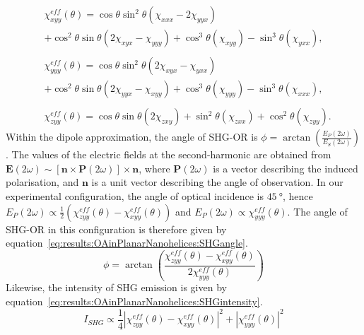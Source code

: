 \begin{equation}\label{eq:results:OAinPlanarNanohelices:ChiEff}
	\begin{split}
		&\chi_{xyy}^{eff}(\theta) = \cos\theta\sin^2\theta(\chi_{xxx} - 2\chi_{yyx}) \\
		&+ {\cos^2}\theta\sin\theta (2\chi _{xyx} - \chi_{yyy}) + {\cos^3}\theta(\chi_{xyy}) - {\sin^3}\theta(\chi _{yxx}), \\
		\\
		&\chi_{yyy}^{eff}(\theta) = \cos\theta\sin^2\theta(2\chi_{xyx} - \chi_{yxx}) \\
		&+ {\cos^2}\theta\sin\theta (2\chi _{yyx} - \chi_{xyy}) + {\cos^3}\theta(\chi_{yyy}) - {\sin^3}\theta(\chi _{xxx}), \\
		\\
		&\chi _{zyy}^{eff}(\theta) = \cos\theta\sin\theta (2\chi_{zxy}) + {\sin^2}\theta(\chi_{zxx}) + {\cos^2}\theta (\chi_{zyy}).
	\end{split}
\end{equation}
Within the dipole approximation, the angle of SHG-OR is $\phi=\arctan{\left(\frac{E_P\left(2\omega\right)}{E_S\left(2\omega\right)}\right)}$. 
The values of the electric fields at the second-harmonic are obtained from ${\mathbf{E}(2\omega)\sim[\mathbf{n}\times\mathbf{P}(2\omega)]\times\mathbf{n}}$, where $\mathbf{P}(2\omega)$ is a vector describing the induced polarisation, and $\mathbf{n}$ is a unit vector describing the angle of observation. 
In our experimental configuration, the angle of optical incidence is $\SI{45}{\degree}$, hence $E_P(2\omega)\propto\frac{1}{2}(\chi_{zyy}^{eff}(\theta)-\chi_{xyy}^{eff}(\theta))$ and $E_P(2\omega)\propto\chi_{yyy}^{eff}(\theta)$. 
The angle of SHG-OR in this configuration is therefore given by equation~\ref{eq:results:OAinPlanarNanohelices:SHGangle}.
\begin{equation}\label{eq:results:OAinPlanarNanohelices:SHGangle}
	\phi  = \arctan \left({\frac{\chi_{zyy}^{eff}(\theta) - \chi _{xyy}^{eff}(\theta)}{2\chi _{yyy}^{eff}(\theta)}}\right)
\end{equation}
Likewise, the intensity of SHG emission is given by equation~\ref{eq:results:OAinPlanarNanohelices:SHGintensity}.
\begin{equation}\label{eq:results:OAinPlanarNanohelices:SHGintensity}
	I_{SHG} \propto \frac{1}{4}{\left| {\chi _{zyy}^{eff}\left( \theta  \right) - \chi _{xyy}^{eff}\left( \theta  \right)} \right|^2} + {\left| {\chi _{yyy}^{eff}\left( \theta  \right)} \right|^2}
\end{equation}
